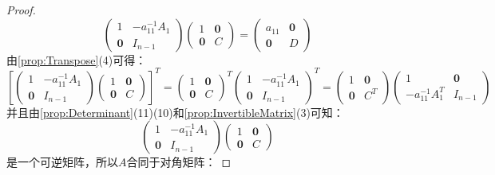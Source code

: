 \begin{proof}
\begin{equation*}
\begin{pmatrix}
			1 & -a_{11}^{-1}A_1 \\
			\mathbf{0} & I_{n-1}
		\end{pmatrix}
		\begin{pmatrix}
			1 & \mathbf{0} \\
			\mathbf{0} & C
		\end{pmatrix}
		=
		\begin{pmatrix}
			a_{11} & \mathbf{0} \\
			\mathbf{0} & D
		\end{pmatrix}
	\end{equation*}
	由\cref{prop:Transpose}(4)可得：
	\begin{equation*}
		\left[
		\begin{pmatrix}
			1 & -a_{11}^{-1}A_1 \\
			\mathbf{0} & I_{n-1}
		\end{pmatrix}
		\begin{pmatrix}
			1 & \mathbf{0} \\
			\mathbf{0} & C
		\end{pmatrix}
		\right]^T
		=
		\begin{pmatrix}
			1 & \mathbf{0} \\
			\mathbf{0} & C
		\end{pmatrix}^T
		\begin{pmatrix}
			1 & -a_{11}^{-1}A_1 \\
			\mathbf{0} & I_{n-1}
		\end{pmatrix}^T
		=
		\begin{pmatrix}
			1 & \mathbf{0} \\
			\mathbf{0} & C^T
		\end{pmatrix}
		\begin{pmatrix}
			1 & \mathbf{0} \\
			-a_{11}^{-1}A_1^T & I_{n-1}
		\end{pmatrix}
	\end{equation*}
	并且由\cref{prop:Determinant}(11)(10)和\cref{prop:InvertibleMatrix}(3)可知：
	\begin{equation*}
		\begin{pmatrix}
			1 & -a_{11}^{-1}A_1 \\
			\mathbf{0} & I_{n-1}
		\end{pmatrix}
		\begin{pmatrix}
			1 & \mathbf{0} \\
			\mathbf{0} & C
		\end{pmatrix}
	\end{equation*}
	是一个可逆矩阵，所以$A$合同于对角矩阵：

\end{proof}
